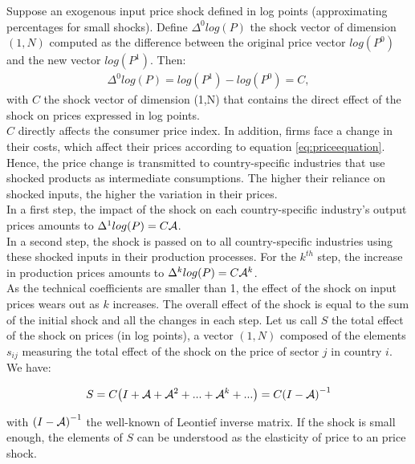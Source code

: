 \documentclass[11pt,a4paper]{article}
\begin{document}
Suppose an exogenous input price shock defined in log points (approximating percentages for small shocks). 
Define ${{\Delta }^{0}}log(P)$ the shock vector of dimension $(1, N)$ computed as the difference between the original price vector $log(P^0)$ and the new  vector $log(P^1)$. Then:
\begin{eqnarray*}
\Delta ^0 log(P)=log(P^1)-log(P^0)=C, 
\end{eqnarray*}
with $C$ the shock vector of dimension (1,N) that contains the direct effect of the shock on prices expressed in log points.\\
$C$ directly affects the consumer price index.
In addition, firms face a change in their costs, which affect their prices according to equation \ref{eq:priceequation}.
Hence, the price change is transmitted to country-specific industries that use shocked products as intermediate consumptions. The higher their reliance on shocked inputs, the higher the variation in their prices.\\
In a first step, the impact of the shock on each country-specific industry's output prices amounts to $\Delta^{1}log(P)=C{\cal A}$.\\
In a second step, the shock is passed on to all country-specific industries using these shocked inputs in their production processes. For the $k^{th}$ step, the increase in production prices amounts to $\Delta^k log(P)=C{\cal A}^k$.\\
As the technical coefficients are smaller than 1, the effect of the shock on input prices wears out as $k$ increases.
The overall effect of the shock is equal to the sum of the initial shock and all the changes in each step.
Let us call $S$ the total effect of the shock on prices (in log points), a vector $(1, N)$ composed of the elements $s_{ij}$ measuring the total effect of the shock on the price of sector $j$ in country $i$. We have: 

\begin{eqnarray}
S=C {\left( I+{\cal A}+{\cal A}^2+...+{\cal A}^k+...\right)} =C {\left( I-{\cal A} \right)}^{-1}
\label{eq:eqchocprix} 
\end{eqnarray}


with ${\left( I-{\cal A} \right)}^{-1}$ the well-known of Leontief inverse matrix. If the shock is small enough, the elements of $S$ can be understood as the elasticity of price to an price shock. 
\end{document}
